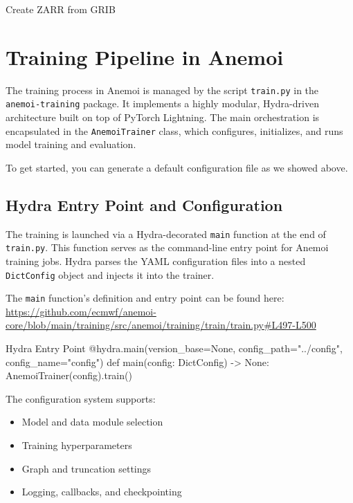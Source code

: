 \begin{codeonly}{Create ZARR from GRIB}
%
\section{Training Pipeline in Anemoi}

The training process in Anemoi is managed by the script \texttt{train.py} in the \texttt{anemoi-training} package. It implements a highly modular, Hydra-driven architecture built on top of PyTorch Lightning. The main orchestration is encapsulated in the \texttt{AnemoiTrainer} class, which configures, initializes, and runs model training and evaluation.

To get started, you can generate a default configuration file as we showed above. 

%
\subsection{Hydra Entry Point and Configuration}

The training is launched via a Hydra-decorated \texttt{main} function at the end of \texttt{train.py}. This function serves as the command-line entry point for Anemoi training jobs. Hydra parses the YAML configuration files into a nested \texttt{DictConfig} object and injects it into the trainer.

The \texttt{main} function's definition and entry point can be found here:
\url{https://github.com/ecmwf/anemoi-core/blob/main/training/src/anemoi/training/train/train.py#L497-L500}

\begin{codeonly}{Hydra Entry Point}
@hydra.main(version_base=None, config_path="../config", config_name="config")
def main(config: DictConfig) -> None:
AnemoiTrainer(config).train()
\end{codeonly}

The configuration system supports:
\begin{itemize}
\item Model and data module selection
\item Training hyperparameters
\item Graph and truncation settings
\item Logging, callbacks, and checkpointing
\end{itemize}


\end{codeonly}
